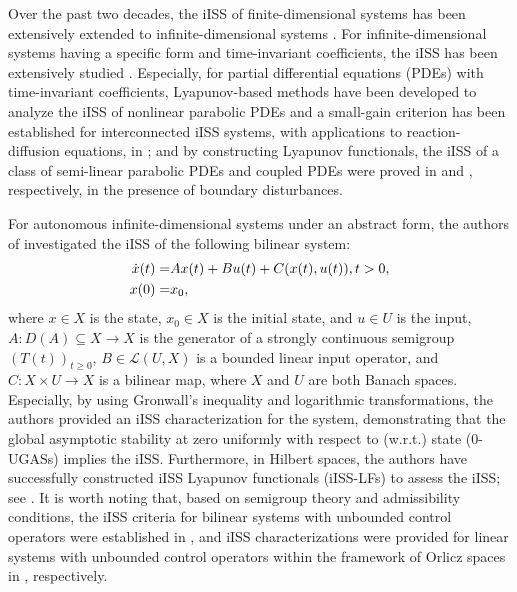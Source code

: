 \documentclass[onecolumn]{autart}
\newenvironment{proof of Prop.ODE}{{\it Proof of Proposition~\ref{Prop.ODE}:\enspace}}{\hfill $\blacksquare$\par}
\newenvironment{proof of PDE}{{\it Proof of Proposition \ref{Prop.8}:\enspace}}{\hfill $\blacksquare$\par}
\begin{document}
Over the past two decades,  the  iISS   of finite-dimensional systems has been extensively extended to infinite-dimensional  systems {\cite{damak2021input,damak2023input,Heni:2025,Hosfeld2022,Karafyllis:book,Lin2018,JoseL2023,mironchenko2016MCRF,Mironchenko2015SIAM,mironchenko2020SIAM,pepe2006, Zheng2018MCSS,zheng2021ALM,zheng2018input,Zheng2018CDC}.}  For infinite-dimensional systems having a   specific form  and time-invariant coefficients, the iISS   has been extensively studied {\cite{Heni:2025,Karafyllis:book,Lin2018,Mironchenko2015SIAM,pepe2006,zheng2018input,Zheng2018MCSS,Zheng2018CDC}}. Especially,   for  partial differential equations (PDEs) with time-invariant coefficients,    Lyapunov-based methods have been developed  to analyze the iISS of  nonlinear parabolic PDEs and   a small-gain criterion has been established for interconnected iISS systems, with applications to reaction-diffusion equations, in \cite{Mironchenko2015SIAM}; and by constructing Lyapunov functionals, the iISS  of  a class of semi-linear parabolic PDEs and {coupled} PDEs   were proved in  \cite{Zheng2018CDC,zheng2018input}  and \cite{Zheng2018MCSS}, respectively, in the presence of boundary disturbances.

For autonomous infinite-dimensional systems under an abstract form, the authors of \cite{mironchenko2016MCRF,mironchenko2020SIAM}  investigated  the iISS of the following  bilinear system: %
\begin{align*}
	\dot{x}(t) = &   A x(t) + B u(t) + C(x(t), u(t)),   t> 0,\notag\\
	{x(0)=}& {x_0,}
\end{align*}
where   $x \in X$ is the state, $x_0 \in X$ is the initial state, and $u \in U$ is the input, $A: D(A) \subseteq X \to X$ is the generator of a strongly continuous semigroup $(T(t))_{t \geq 0}$, $B \in \mathcal{L}(U, X)$ is a bounded   linear input operator, and $C: X \times U \to X$ is a bilinear map,   where  $X$  and $U$ are both {Banach spaces}.
Especially,   by using Gronwall's inequality and logarithmic transformations, the authors provided an iISS characterization for the system, demonstrating that the {global} asymptotic stability  at zero uniformly with
respect to {(w.r.t.)} state  (0-UGASs) implies the iISS. Furthermore, in Hilbert spaces,  the authors have successfully constructed  iISS Lyapunov functionals (iISS-LFs)    to assess the iISS; see \cite{mironchenko2016MCRF,mironchenko2020SIAM}.       It is worth noting that, based on semigroup theory and admissibility conditions,  the iISS criteria for bilinear systems with unbounded control operators  were established   in \cite{Hosfeld2022},  and iISS characterizations   were provided    for linear systems with unbounded control operators   within the framework of Orlicz spaces  in \cite{Jacob2018}, respectively.
\end{document}
